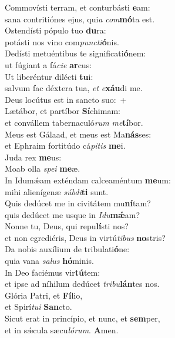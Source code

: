 \evenverse Commovísti terram, et conturbásti \textbf{e}am:~\*\\
\evenverse sana contritiónes ejus, qui\textit{a} \textit{com}\textbf{mó}ta est.\\
\oddverse Ostendísti pópulo tuo \textbf{du}ra:~\*\\
\oddverse potásti nos vino com\textit{pun}\textit{cti}\textbf{ó}nis.\\
\evenverse Dedísti metuéntibus te significati\textbf{ó}nem:~\*\\
\evenverse ut fúgiant a fá\textit{ci}\textit{e} \textbf{ar}cus:\\
\oddverse Ut liberéntur dilécti \textbf{tu}i:~\*\\
\oddverse salvum fac déxtera tua, \textit{et} \textit{e}\textbf{xáu}di me.\\
\evenverse Deus locútus est in sancto suo:~+\\
\evenverse  Lætábor, et partíbor \textbf{Sí}chimam:~\*\\
\evenverse et convállem tabernaculó\textit{rum} \textit{me}\textbf{tí}bor.\\
\oddverse Meus est Gálaad, et meus est Ma\textbf{nás}ses:~\*\\
\oddverse et Ephraim fortitúdo cá\textit{pi}\textit{tis} \textbf{me}i.\\
\evenverse Juda rex \textbf{me}us:~\*\\
\evenverse Moab olla \textit{spe}\textit{i} \textbf{me}æ.\\
\oddverse In Idumǽam exténdam calceaméntum \textbf{me}um:~\*\\
\oddverse mihi alienígenæ \textit{súb}\textit{di}\textbf{ti} sunt.\\
\evenverse Quis dedúcet me in civitátem mu\textbf{ní}tam?~\*\\
\evenverse quis dedúcet me usque in \textit{I}\textit{du}\textbf{mǽ}am?\\
\oddverse Nonne tu, Deus, qui repu\textbf{lí}sti nos?~\*\\
\oddverse et non egrediéris, Deus in virtú\textit{ti}\textit{bus} \textbf{no}stris?\\
\evenverse Da nobis auxílium de tribulati\textbf{ó}ne:~\*\\
\evenverse quia vana \textit{sa}\textit{lus} \textbf{hó}minis.\\
\oddverse In Deo faciémus vir\textbf{tú}tem:~\*\\
\oddverse et ipse ad níhilum dedúcet \textit{tri}\textit{bu}\textbf{lán}tes nos.\\
\evenverse Glória Patri, et \textbf{Fí}lio,~\*\\
\evenverse et Spirí\textit{tu}\textit{i} \textbf{San}cto.\\
\oddverse Sicut erat in princípio, et nunc, et \textbf{sem}per,~\*\\
\oddverse et in sǽcula sæcu\textit{ló}\textit{rum}. \textbf{A}men.\\
